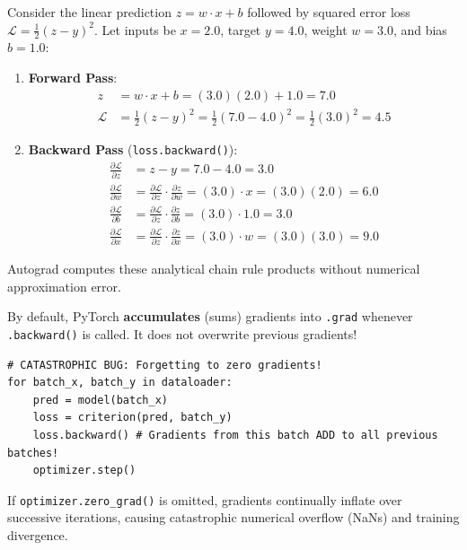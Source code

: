 \begin{example}
Consider the linear prediction $z = w \cdot x + b$ followed by squared error loss $\mathcal{L} = \frac{1}{2}(z - y)^2$. Let inputs be $x = 2.0$, target $y = 4.0$, weight $w = 3.0$, and bias $b = 1.0$:
\begin{enumerate}
    \item \textbf{Forward Pass}:
    \begin{align*}
    z &= w \cdot x + b = (3.0)(2.0) + 1.0 = 7.0 \\
    \mathcal{L} &= \frac{1}{2}(z - y)^2 = \frac{1}{2}(7.0 - 4.0)^2 = \frac{1}{2}(3.0)^2 = \mathbf{4.5}
    \end{align*}
    \item \textbf{Backward Pass} (\texttt{loss.backward()}):
    \begin{align*}
    \frac{\partial \mathcal{L}}{\partial z} &= z - y = 7.0 - 4.0 = 3.0 \\
    \frac{\partial \mathcal{L}}{\partial w} &= \frac{\partial \mathcal{L}}{\partial z} \cdot \frac{\partial z}{\partial w} = (3.0) \cdot x = (3.0)(2.0) = \mathbf{6.0} \\
    \frac{\partial \mathcal{L}}{\partial b} &= \frac{\partial \mathcal{L}}{\partial z} \cdot \frac{\partial z}{\partial b} = (3.0) \cdot 1.0 = \mathbf{3.0} \\
    \frac{\partial \mathcal{L}}{\partial x} &= \frac{\partial \mathcal{L}}{\partial z} \cdot \frac{\partial z}{\partial x} = (3.0) \cdot w = (3.0)(3.0) = \mathbf{9.0}
    \end{align*}
\end{enumerate}
Autograd computes these analytical chain rule products without numerical approximation error.
\end{example}

\begin{warning}
By default, PyTorch \textbf{accumulates} (sums) gradients into \texttt{.grad} whenever \texttt{.backward()} is called. It does not overwrite previous gradients!
\begin{lstlisting}[style=pythonstyle]
# CATASTROPHIC BUG: Forgetting to zero gradients!
for batch_x, batch_y in dataloader:
    pred = model(batch_x)
    loss = criterion(pred, batch_y)
    loss.backward() # Gradients from this batch ADD to all previous batches!
    optimizer.step()
\end{lstlisting}
If \texttt{optimizer.zero\_grad()} is omitted, gradients continually inflate over successive iterations, causing catastrophic numerical overflow (NaNs) and training divergence.
\end{warning}

